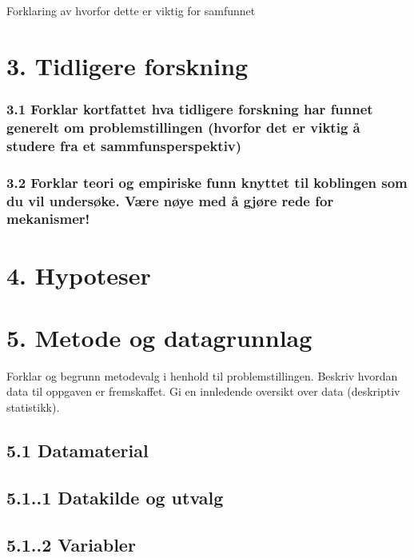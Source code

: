 \documentclass[
  12pt,
  a4paper,
  DIV=11,
  numbers=noendperiod]{scrartcl}
\begin{document}
Forklaring av hvorfor dette er viktig for samfunnet

\section{3. Tidligere forskning}\label{tidligere-forskning}

\subsubsection{3.1 Forklar kortfattet hva tidligere forskning har funnet
generelt om problemstillingen (hvorfor det er viktig å studere fra et
sammfunsperspektiv)}\label{forklar-kortfattet-hva-tidligere-forskning-har-funnet-generelt-om-problemstillingen-hvorfor-det-er-viktig-uxe5-studere-fra-et-sammfunsperspektiv}

\subsubsection{3.2 Forklar teori og empiriske funn knyttet til koblingen
som du vil undersøke. Være nøye med å gjøre rede for
mekanismer!}\label{forklar-teori-og-empiriske-funn-knyttet-til-koblingen-som-du-vil-undersuxf8ke.-vuxe6re-nuxf8ye-med-uxe5-gjuxf8re-rede-for-mekanismer}

\section{4. Hypoteser}\label{hypoteser}

\section{5. Metode og datagrunnlag}\label{metode-og-datagrunnlag}

Forklar og begrunn metodevalg i henhold til problemstillingen. Beskriv
hvordan data til oppgaven er fremskaffet. Gi en innledende oversikt over
data (deskriptiv statistikk).

\subsection{5.1 Datamaterial}\label{datamaterial}

\subsection{5.1..1 Datakilde og utvalg}\label{datakilde-og-utvalg}

\subsection{5.1..2 Variabler}\label{variabler}
\end{document}
